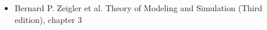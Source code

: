 \documentclass{beamer}
\begin{document}
\begin{frame}
\begin{columns}
\begin{column}{0.5\linewidth}
\begin{itemize}
\item<1-> {\color{gray} Bernard P. Zeigler et al. Theory of Modeling and Simulation (Third edition), chapter 3}
\end{itemize}
\end{column}
\begin{column}{0.5\linewidth}
%
\end{column}
\end{columns}
\end{frame}
\end{document}
